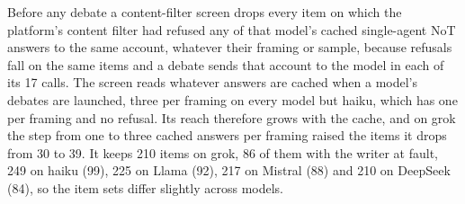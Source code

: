 Before any debate a
content-filter screen drops every item on which the platform's content filter
had refused any of that model's cached single-agent NoT answers to the same
account, whatever their framing or sample, because refusals fall on the same
items and a debate sends that account to the model in each of its 17 calls.
The screen reads whatever answers are cached when a model's debates are
launched, three per framing on every model but haiku, which has one per
framing and no refusal. Its reach therefore grows with the cache, and on grok
the step from one to three cached answers per framing raised the items it
drops from 30 to 39. It keeps 210 items on grok, 86 of them with the writer
at fault, 249 on haiku (99), 225 on Llama (92), 217 on Mistral (88) and 210 on
DeepSeek (84), so the item sets differ slightly across models.
